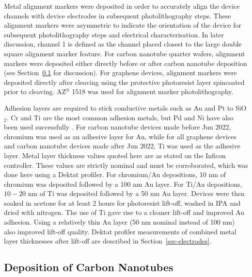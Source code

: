 \documentclass[
  a4paper,
]{scrbook}
\begin{document}
Metal alignment markers were deposited in order to accurately align the
device channels with device electrodes in subsequent photolithography
steps. These alignment markers were asymmetric to indicate the
orientation of the device for subsequent photolithography steps and
electrical characterisation. In later discussion, channel 1 is defined
as the channel placed closest to the large double square alignment
marker feature. For carbon nanotube quarter wafers, alignment markers
were deposited either directly before or after carbon nanotube
deposition (see Section~\ref{sec-dep-carbon-nanotubes} for discussion).
For graphene devices, alignment markers were deposited directly after
cleaving using the protective photoresist layer spincoated prior to
cleaving. AZ\(^\circledR\) 1518 was used for alignment marker
photolithography.

Adhesion layers are required to stick conductive metals such as Au and
Pt to SiO\(_2\). Cr and Ti are the most common adhesion metals, but Pd
and Ni have also been used successfully
\autocite{Guarnieri2014,Shkodra2021}. For carbon nanotube devices made
before Jun 2022, chromium was used as an adhesive layer for Au, while
for all graphene devices and carbon nanotube devices made after Jun
2022, Ti was used as the adhesive layer. Metal layer thickness values
quoted here are as stated on the Inficon controller. These values are
strictly nominal and must be corroborated, which was done here using a
Dektat profiler. For chromium/Au depositions, 10 nm of chromium was
deposited followed by a 100 nm Au layer. For Ti/Au depositions,
\(10-20\) nm of Ti was deposited followed by a 50 nm Au layer. Devices
were then soaked in acetone for at least 2 hours for photoresist
lift-off, washed in IPA and dried with nitrogen. The use of Ti gave rise
to a cleaner lift-off and improved Au adhesion. Using a relatively thin
Au layer (50 nm nominal instead of 100 nm) also improved lift-off
quality. Dektat profiler measurements of combined metal layer
thicknesses after lift-off are described in
Section~\ref{sec-electrodes}.

\hypertarget{sec-dep-carbon-nanotubes}{%
\subsection{Deposition of Carbon
Nanotubes}\label{sec-dep-carbon-nanotubes}}
\end{document}

